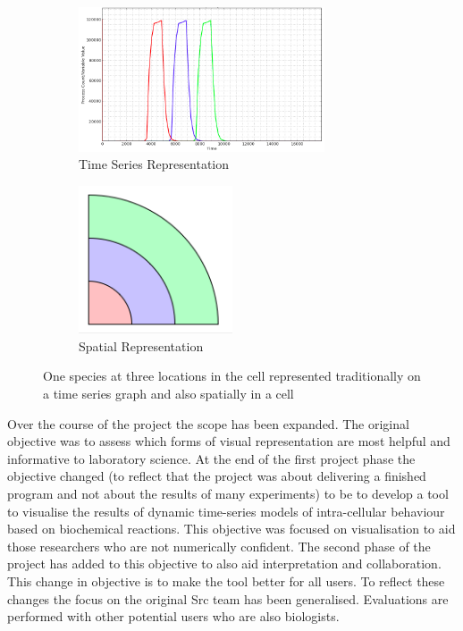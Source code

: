 \begin{figure}[h!]
    \centering
    \begin{subfigure}[b]{0.4\textwidth}
        \centering
        \includegraphics[width=0.8\textwidth]{images/asrc_graph_intro.png}
        \caption{Time Series Representation}
        \label{fig:asrc_graph_intro}
    \end{subfigure}
    \begin{subfigure}[b]{0.4\textwidth}
        \centering
        \includegraphics[width=0.5\textwidth]{images/asrc_cell_intro.png}
        \caption{Spatial Representation}
        \label{fig:asrc_cell_intro}
    \end{subfigure}
    \caption{One species at three locations in the cell represented traditionally on a time series graph and also spatially in a cell}
    \label{fig:asrc_intro}
\end{figure}


Over the course of the project the scope has been expanded.  The original objective was to assess which forms of visual representation are most helpful and informative to laboratory science.  At the end of the first project phase the objective changed (to reflect that the project was about delivering a finished program and not about the results of many experiments) to be to develop a tool to visualise the results of dynamic time-series models of intra-cellular behaviour based on biochemical reactions.  This objective was focused on visualisation to aid those researchers who are not numerically confident.  The second phase of the project has added to this objective to also aid interpretation and collaboration.  This change in objective is to make the tool better for all users.  To reflect these changes the focus on the original Src team has been generalised.  Evaluations are performed with other potential users who are also biologists.

